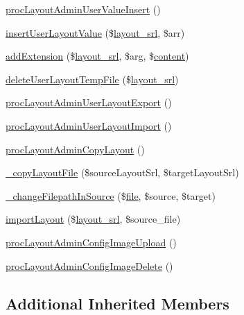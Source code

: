 \begin{DoxyCompactItemize}
\item 
\hyperlink{classlayoutAdminController_a082aafb8b2911065e3bf5a025aa2be22}{proc\-Layout\-Admin\-User\-Value\-Insert} ()
\item 
\hyperlink{classlayoutAdminController_aac54b67b3c534c9f900ac729c637fe75}{insert\-User\-Layout\-Value} (\$\hyperlink{ko_8install_8php_a70054876db09b2519a1726663c8dd9e7}{layout\-\_\-srl}, \$arr)
\item 
\hyperlink{classlayoutAdminController_abbe4f51bbf4925b60d6cf966117d9c6a}{add\-Extension} (\$\hyperlink{ko_8install_8php_a70054876db09b2519a1726663c8dd9e7}{layout\-\_\-srl}, \$arg, \$\hyperlink{classcontent}{content})
\item 
\hyperlink{classlayoutAdminController_a993e68df95066c306c09b550ac705b1e}{delete\-User\-Layout\-Temp\-File} (\$\hyperlink{ko_8install_8php_a70054876db09b2519a1726663c8dd9e7}{layout\-\_\-srl})
\item 
\hyperlink{classlayoutAdminController_a51cfe704e67bb01f9f3e471f097e5684}{proc\-Layout\-Admin\-User\-Layout\-Export} ()
\item 
\hyperlink{classlayoutAdminController_a82cf560f92d64e4d76e90c969ebcda70}{proc\-Layout\-Admin\-User\-Layout\-Import} ()
\item 
\hyperlink{classlayoutAdminController_afaf005eb86d8c09e2c610f743dbb1522}{proc\-Layout\-Admin\-Copy\-Layout} ()
\item 
\hyperlink{classlayoutAdminController_a0663f5b179989279c5c73a3badd12c1c}{\-\_\-copy\-Layout\-File} (\$source\-Layout\-Srl, \$target\-Layout\-Srl)
\item 
\hyperlink{classlayoutAdminController_a9dd8cb93d56db698fd6426a11dad6056}{\-\_\-change\-Filepath\-In\-Source} (\$\hyperlink{classfile}{file}, \$source, \$target)
\item 
\hyperlink{classlayoutAdminController_a2ef8e75c33c7e33102beaa0051a0d113}{import\-Layout} (\$\hyperlink{ko_8install_8php_a70054876db09b2519a1726663c8dd9e7}{layout\-\_\-srl}, \$source\-\_\-file)
\item 
\hyperlink{classlayoutAdminController_a24154a31e823e961c03d808257147700}{proc\-Layout\-Admin\-Config\-Image\-Upload} ()
\item 
\hyperlink{classlayoutAdminController_ae6b9af868b9694fc6ad85c9496595d24}{proc\-Layout\-Admin\-Config\-Image\-Delete} ()
\end{DoxyCompactItemize}
\subsection*{Additional Inherited Members}



